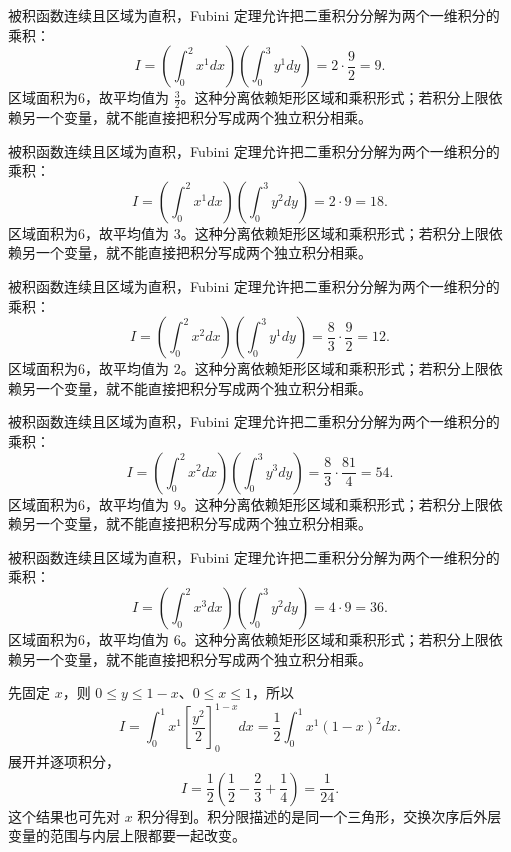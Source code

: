 \documentclass[12pt,fontset=fandol]{ctexart}
\begin{document}
\begin{solve}\label{ans:c36q3}
被积函数连续且区域为直积，Fubini 定理允许把二重积分分解为两个一维积分的乘积：
\[
I=\left(\int_0^2x^{1}dx\right)\left(\int_0^3y^{1}dy\right)=2\cdot\frac{9}{2}=9.
\]
区域面积为6，故平均值为 $\frac{3}{2}$。这种分离依赖矩形区域和乘积形式；若积分上限依赖另一个变量，就不能直接把积分写成两个独立积分相乘。
\end{solve}

\begin{solve}\label{ans:c36q4}
被积函数连续且区域为直积，Fubini 定理允许把二重积分分解为两个一维积分的乘积：
\[
I=\left(\int_0^2x^{1}dx\right)\left(\int_0^3y^{2}dy\right)=2\cdot9=18.
\]
区域面积为6，故平均值为 $3$。这种分离依赖矩形区域和乘积形式；若积分上限依赖另一个变量，就不能直接把积分写成两个独立积分相乘。
\end{solve}

\begin{solve}\label{ans:c36q5}
被积函数连续且区域为直积，Fubini 定理允许把二重积分分解为两个一维积分的乘积：
\[
I=\left(\int_0^2x^{2}dx\right)\left(\int_0^3y^{1}dy\right)=\frac{8}{3}\cdot\frac{9}{2}=12.
\]
区域面积为6，故平均值为 $2$。这种分离依赖矩形区域和乘积形式；若积分上限依赖另一个变量，就不能直接把积分写成两个独立积分相乘。
\end{solve}

\begin{solve}\label{ans:c36q6}
被积函数连续且区域为直积，Fubini 定理允许把二重积分分解为两个一维积分的乘积：
\[
I=\left(\int_0^2x^{2}dx\right)\left(\int_0^3y^{3}dy\right)=\frac{8}{3}\cdot\frac{81}{4}=54.
\]
区域面积为6，故平均值为 $9$。这种分离依赖矩形区域和乘积形式；若积分上限依赖另一个变量，就不能直接把积分写成两个独立积分相乘。
\end{solve}

\begin{solve}\label{ans:c36q7}
被积函数连续且区域为直积，Fubini 定理允许把二重积分分解为两个一维积分的乘积：
\[
I=\left(\int_0^2x^{3}dx\right)\left(\int_0^3y^{2}dy\right)=4\cdot9=36.
\]
区域面积为6，故平均值为 $6$。这种分离依赖矩形区域和乘积形式；若积分上限依赖另一个变量，就不能直接把积分写成两个独立积分相乘。
\end{solve}

\begin{solve}\label{ans:c36q8}
先固定 $x$，则 $0\le y\le1-x$、$0\le x\le1$，所以
\[
I=\int_0^1x^{1}\left[\frac{y^2}2\right]_0^{1-x}dx=\frac12\int_0^1x^{1}(1-x)^2dx.
\]
展开并逐项积分，
\[
I=\frac12\left(\frac1{2}-\frac2{3}+\frac1{4}\right)=\frac{1}{24}.
\]
这个结果也可先对 $x$ 积分得到。积分限描述的是同一个三角形，交换次序后外层变量的范围与内层上限都要一起改变。
\end{solve}
\end{document}

